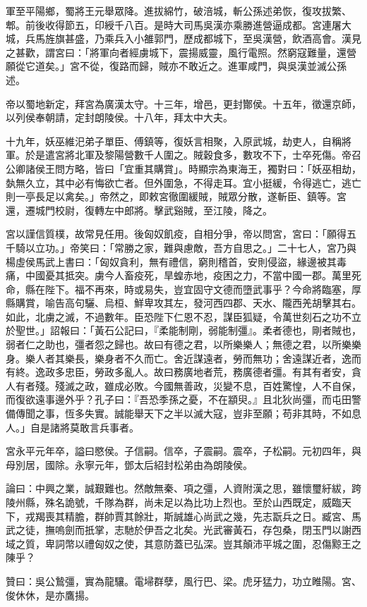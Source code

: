 \begin{pinyinscope}
軍至平陽鄉，蜀將王元舉眾降。進拔綿竹，破涪城，斬公孫述弟恢，復攻拔繁、郫。前後收得節五，印綬千八百。是時大司馬吳漢亦乘勝進營逼成都。宮連屠大城，兵馬旌旗甚盛，乃乘兵入小雒郭門，歷成都城下，至吳漢營，飲酒高會。漢見之甚歡，謂宮曰：「將軍向者經虜城下，震揚威靈，風行電照。然窮寇難量，還營願從它道矣。」宮不從，復路而歸，賊亦不敢近之。進軍咸門，與吳漢並滅公孫述。

帝以蜀地新定，拜宮為廣漢太守。十三年，增邑，更封酇侯。十五年，徵還京師，以列侯奉朝請，定封朗陵侯。十八年，拜太中大夫。

十九年，妖巫維汜弟子單臣、傅鎮等，復妖言相聚，入原武城，劫吏人，自稱將軍。於是遣宮將北軍及黎陽營數千人圍之。賊穀食多，數攻不下，士卒死傷。帝召公卿諸侯王問方略，皆曰「宜重其購賞」。時顯宗為東海王，獨對曰：「妖巫相劫，埶無久立，其中必有悔欲亡者。但外圍急，不得走耳。宜小挺緩，令得逃亡，逃亡則一亭長足以禽矣。」帝然之，即敕宮徹圍緩賊，賊眾分散，遂斬臣、鎮等。宮還，遷城門校尉，復轉左中郎將。擊武谿賊，至江陵，降之。

宮以謹信質樸，故常見任用。後匈奴飢疫，自相分爭，帝以問宮，宮曰：「願得五千騎以立功。」帝笑曰：「常勝之家，難與慮敵，吾方自思之。」二十七人，宮乃與楊虛侯馬武上書曰：「匈奴貪利，無有禮信，窮則稽首，安則侵盜，緣邊被其毒痛，中國憂其抵突。虜今人畜疫死，旱蝗赤地，疫困之力，不當中國一郡。萬里死命，縣在陛下。福不再來，時或易失，豈宜固守文德而墮武事乎？今命將臨塞，厚縣購賞，喻告高句驪、烏桓、鮮卑攻其左，發河西四郡、天水、隴西羌胡擊其右。如此，北虜之滅，不過數年。臣恐陛下仁恩不忍，謀臣狐疑，令萬世刻石之功不立於聖世。」詔報曰：「黃石公記曰，『柔能制剛，弱能制彊』。柔者德也，剛者賊也，弱者仁之助也，彊者怨之歸也。故曰有德之君，以所樂樂人；無德之君，以所樂樂身。樂人者其樂長，樂身者不久而亡。舍近謀遠者，勞而無功；舍遠謀近者，逸而有終。逸政多忠臣，勞政多亂人。故曰務廣地者荒，務廣德者彊。有其有者安，貪人有者殘。殘滅之政，雖成必敗。今國無善政，災變不息，百姓驚惶，人不自保，而復欲遠事邊外乎？孔子曰：『吾恐季孫之憂，不在顓臾。』且北狄尚彊，而屯田警備傳聞之事，恆多失實。誠能舉天下之半以滅大寇，豈非至願；苟非其時，不如息人。」自是諸將莫敢言兵事者。

宮永平元年卒，謚曰愍侯。子信嗣。信卒，子震嗣。震卒，子松嗣。元初四年，與母別居，國除。永寧元年，鄧太后紹封松弟由為朗陵侯。

論曰：中興之業，誠艱難也。然敵無秦、項之彊，人資附漢之思，雖懷璽紆紱，跨陵州縣，殊名詭號，千隊為群，尚未足以為比功上烈也。至於山西既定，威臨天下，戎羯喪其精膽，群帥賈其餘壯，斯誠雄心尚武之幾，先志翫兵之日。臧宮、馬武之徒，撫嗚劍而扺掌，志馳於伊吾之北矣。光武審黃石，存包桑，閉玉門以謝西域之質，卑詞幣以禮匈奴之使，其意防蓋已弘深。豈其顛沛平城之圍，忍傷黥王之陳乎？

贊曰：吳公鷙彊，實為龍驤。電埽群孽，風行巴、梁。虎牙猛力，功立睢陽。宮、俊休休，是亦鷹揚。


\end{pinyinscope}
